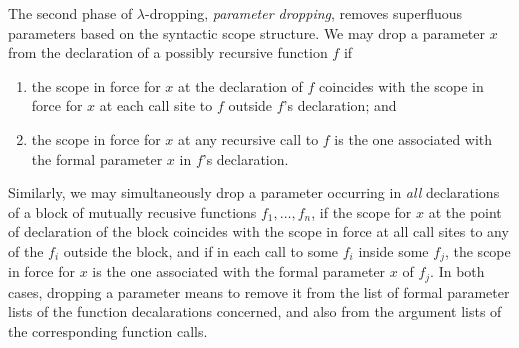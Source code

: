 The second phase of $\lambda$-dropping, \emph{parameter dropping},
removes superfluous parameters based on the syntactic scope structure.
We may drop a parameter $x$ from the declaration of a possibly
recursive function $f$ if
\begin{enumerate}
\item\label{ParameterDroppingConditionOne}
  the scope in force for $x$ at the declaration of $f$ coincides
  with the scope in force for $x$ at each call site to $f$
  outside $f$'s declaration; and
\item\label{ParameterDroppingConditionTwo} 
  the scope in force for $x$ at any recursive call to $f$ is the
  one associated with the formal parameter $x$ in $f$'s declaration.
\end{enumerate}
Similarly, we may simultaneously drop a parameter occurring in
\emph{all} declarations of a block of mutually recusive functions
$f_1,\ldots,f_n$, if the scope for $x$ at the point of declaration of
the block coincides with the scope in force at all call sites to any
of the $f_i$ outside the block, and if in each call to some $f_i$
inside some $f_j$, the scope in force for $x$ is the one associated
with the formal parameter $x$ of $f_j$. In both cases, dropping a
parameter means to remove it from the list of formal parameter lists
of the function decalarations concerned, and also from the argument
lists of the corresponding function calls.

